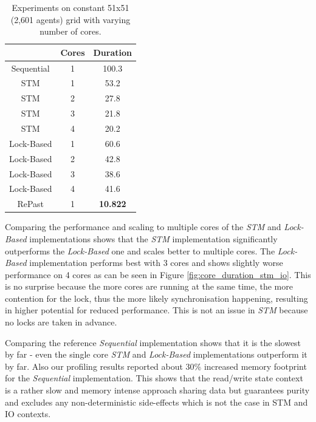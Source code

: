 \begin{table}
	\centering
  	\begin{tabular}{ c || c | c  }
                    & Cores & Duration  \\ \hline \hline 
    	Sequential  & 1     & 100.3     \\ \hline \hline
   		STM         & 1     & 53.2      \\ \hline
   		STM         & 2     & 27.8      \\ \hline
   		STM         & 3     & 21.8      \\ \hline
   		STM         & 4     & 20.2      \\ \hline \hline
   		Lock-Based  & 1     & 60.6      \\ \hline 
   		Lock-Based  & 2     & 42.8      \\ \hline 
   		Lock-Based  & 3     & 38.6      \\ \hline 
   		Lock-Based  & 4     & 41.6      \\ \hline \hline
   		RePast      & 1     & \textbf{10.822} \\ \hline \hline
  	\end{tabular}
  	
  	\caption{Experiments on constant 51x51 (2,601 agents) grid with varying number of cores.}
	\label{tab:constgrid_varyingcores}
\end{table}

Comparing the performance and scaling to multiple cores of the \textit{STM} and \textit{Lock-Based} implementations shows that the \textit{STM} implementation significantly outperforms the \textit{Lock-Based} one and scales better to multiple cores. The \textit{Lock-Based} implementation performs best with 3 cores and shows slightly worse performance on 4 cores as can be seen in Figure \ref{fig:core_duration_stm_io}. This is no surprise because the more cores are running at the same time, the more contention for the lock, thus the more likely synchronisation happening, resulting in higher potential for reduced performance. This is not an issue in \textit{STM} because no locks are taken in advance. 

Comparing the reference \textit{Sequential} implementation shows that it is the slowest by far - even the single core \textit{STM} and \textit{Lock-Based} implementations outperform it by far. Also our profiling results reported about 30\% increased memory footprint for the \textit{Sequential} implementation. This shows that the read/write state context is a rather slow and memory intense approach sharing data but guarantees purity and excludes any non-deterministic side-effects which is not the case in STM and IO contexts.

